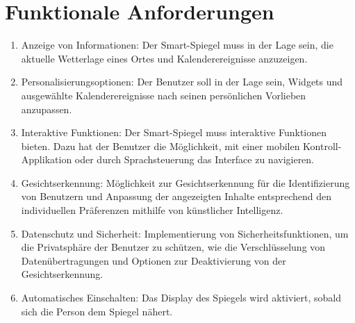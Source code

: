\documentclass{article}
\begin{document}
\section{Funktionale Anforderungen}
\begin{enumerate}[label=\textbf{FA\arabic*:}]
    \item Anzeige von Informationen: Der Smart-Spiegel muss in der Lage sein, die aktuelle Wetterlage eines Ortes und Kalenderereignisse anzuzeigen.
    \item Personalisierungsoptionen: Der Benutzer soll in der Lage sein, Widgets und ausgewählte Kalenderereignisse nach seinen persönlichen Vorlieben anzupassen.
    \item Interaktive Funktionen: Der Smart-Spiegel muss interaktive Funktionen bieten. Dazu hat der Benutzer die Möglichkeit, mit einer mobilen Kontroll-Applikation oder durch Sprachsteuerung das Interface zu navigieren.
    \item Gesichtserkennung: Möglichkeit zur Gesichtserkennung für die Identifizierung von Benutzern und Anpassung der angezeigten Inhalte entsprechend den individuellen Präferenzen mithilfe von künstlicher Intelligenz.
    \item Datenschutz und Sicherheit: Implementierung von Sicherheitsfunktionen, um die Privatsphäre der Benutzer zu schützen, wie die Verschlüsselung von Datenübertragungen und Optionen zur Deaktivierung von der Gesichtserkennung.
    \item Automatisches Einschalten: Das Display des Spiegels wird aktiviert, sobald sich die Person dem Spiegel nähert.
\end{enumerate}
\end{document}
